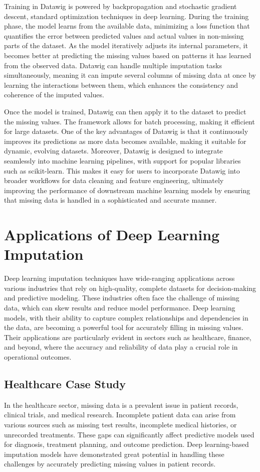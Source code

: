 \documentclass{article}
\begin{document}
Training in Datawig is powered by backpropagation and stochastic gradient descent, standard optimization techniques in deep learning. During the training phase, the model learns from the available data, minimizing a loss function that quantifies the error between predicted values and actual values in non-missing parts of the dataset. As the model iteratively adjusts its internal parameters, it becomes better at predicting the missing values based on patterns it has learned from the observed data. Datawig can handle multiple imputation tasks simultaneously, meaning it can impute several columns of missing data at once by learning the interactions between them, which enhances the consistency and coherence of the imputed values.

Once the model is trained, Datawig can then apply it to the dataset to predict the missing values. The framework allows for batch processing, making it efficient for large datasets. One of the key advantages of Datawig is that it continuously improves its predictions as more data becomes available, making it suitable for dynamic, evolving datasets. Moreover, Datawig is designed to integrate seamlessly into machine learning pipelines, with support for popular libraries such as scikit-learn. This makes it easy for users to incorporate Datawig into broader workflows for data cleaning and feature engineering, ultimately improving the performance of downstream machine learning models by ensuring that missing data is handled in a sophisticated and accurate manner.
\pagebreak

\section{Applications of Deep Learning Imputation}
Deep learning imputation techniques have wide-ranging applications across various industries that rely on high-quality, complete datasets for decision-making and predictive modeling. These industries often face the challenge of missing data, which can skew results and reduce model performance. Deep learning models, with their ability to capture complex relationships and dependencies in the data, are becoming a powerful tool for accurately filling in missing values. Their applications are particularly evident in sectors such as healthcare, finance, and beyond, where the accuracy and reliability of data play a crucial role in operational outcomes.

\subsection{Healthcare Case Study}
In the healthcare sector, missing data is a prevalent issue in patient records, clinical trials, and medical research. Incomplete patient data can arise from various sources such as missing test results, incomplete medical histories, or unrecorded treatments. These gaps can significantly affect predictive models used for diagnosis, treatment planning, and outcome prediction. Deep learning-based imputation models have demonstrated great potential in handling these challenges by accurately predicting missing values in patient records.
\end{document}
